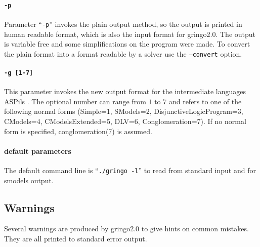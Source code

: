 \documentclass[a4paper,10pt]{article}
\begin{document}
\paragraph{\texttt{-p}}
Parameter ``\texttt{-p}'' invokes the plain output method, so the output is printed in human readable format, which is also the input format for gringo2.0. The output is variable free and some simplifications on the program were made. To convert the plain format into a format readable by a solver use the \texttt{--convert} option.
\paragraph{\texttt{-g [1-7]}}
This parameter invokes the new output format for the intermediate languages ASPils \cite{atleastthisreferenceishouldgive}. The optional number can range from $1$ to $7$ and refers to one of the following normal forms (Simple=1, SModels=2, DisjunctiveLogicProgram=3, CModels=4, CModelsExtended=5, DLV=6, Conglomeration=7). If no normal form is specified, conglomeration(7)  is assumed.

\paragraph{default parameters}
The default command line is ``\texttt{./gringo -l}'' to read from standard input and for smodels output.

\subsection{Warnings}
Several warnings are produced by gringo2.0 to give hints on common mistakes.
They are all printed to standard error output.
\end{document}
